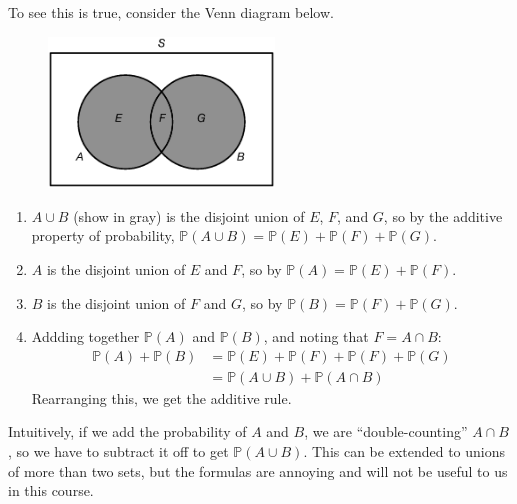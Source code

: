 \documentclass[12pt]{article}
\theoremstyle{definition}
\theoremstyle{remark}
\def\P{{\mathbb P}}
\begin{document}
To see this is true, consider the Venn diagram below.
\begin{figure}[H]
\centering
\includegraphics[width=6cm]{additive.eps}
\end{figure}
\begin{enumerate}
\item $A \cup B$ (show in gray) is the disjoint union of $E$, $F$, and $G$, so by the additive property of probability, $\P(A \cup B) = \P(E) + \P(F) + \P(G)$.
\item $A$ is the disjoint union of $E$ and $F$, so by $\P(A) = \P(E) + \P(F)$.
\item $B$ is the disjoint union of $F$ and $G$, so by $\P(B) = \P(F) + \P(G)$.
\item Addding together $\P(A)$ and $\P(B)$, and noting that $F = A \cap B$:
\begin{align*}
\P(A) + \P(B) &= \P(E) + \P(F) + \P(F) + \P(G) \\
&= \P(A \cup B) + \P(A \cap B)
\end{align*}
Rearranging this, we get the additive rule.
\end{enumerate}
Intuitively, if we add the probability of $A$ and $B$, we are ``double-counting'' $A \cap B$, so we have to subtract it off to get $\P(A \cup B)$. This can be extended to unions of more than two sets, but the formulas are annoying and will not be useful to us in this course. 
\end{document}
